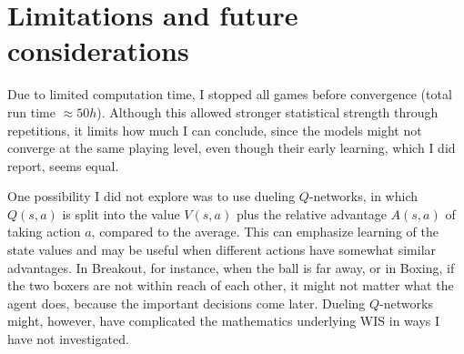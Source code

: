 \documentclass{article}
\begin{document}
\section{Limitations and future considerations}
Due to limited computation time, I stopped all games before convergence (total run time \(\approx50h\)). Although this allowed stronger statistical strength through repetitions, it limits how much I can conclude, since the models might not converge at the same playing level, even though their early learning, which I did report, seems equal.

One possibility I did not explore was to use dueling \(Q\)-networks, in which \(Q(s,a)\) is split into the value \(V(s,a)\) plus the relative advantage \(A(s,a)\) of taking action \(a\), compared to the average. This can emphasize learning of the state values and may be useful when different actions have somewhat similar advantages. In Breakout, for instance, when the ball is far away, or in Boxing, if the two boxers are not within reach of each other, it might not matter what the agent does, because the important decisions come later. Dueling \(Q\)-networks might, however, have complicated the mathematics underlying WIS in ways I have not investigated.
\end{document}
